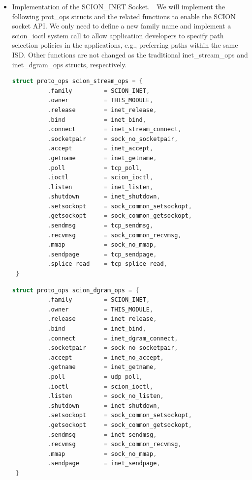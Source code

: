 \begin{itemize}
\item{Implementation of the SCION\_INET Socket.}\ \ We will implement the following prot\_ops
structs and the related functions to enable the SCION socket API. We
only need to define a new family name and implement a scion\_ioctl
system call to allow application developers to specify path
selection policies in the applications, e.g., preferring paths
within the same ISD. Other functions are not changed as the
traditional inet\_stream\_ops and inet\_dgram\_ops structs,
respectively.

\begin{footnotesize}
\begin{lstlisting}[language=C]
 struct proto_ops scion_stream_ops = {
          .family         = SCION_INET,
          .owner          = THIS_MODULE,
          .release        = inet_release,
          .bind           = inet_bind,
          .connect        = inet_stream_connect,
          .socketpair     = sock_no_socketpair,
          .accept         = inet_accept,
          .getname        = inet_getname,
          .poll           = tcp_poll,
          .ioctl          = scion_ioctl,
          .listen         = inet_listen,
          .shutdown       = inet_shutdown,
          .setsockopt     = sock_common_setsockopt,
          .getsockopt     = sock_common_getsockopt,
          .sendmsg        = tcp_sendmsg,
          .recvmsg        = sock_common_recvmsg,
          .mmap           = sock_no_mmap,
          .sendpage       = tcp_sendpage,
          .splice_read    = tcp_splice_read,
 }
\end{lstlisting}

\begin{lstlisting}[language=C]
 struct proto_ops scion_dgram_ops = {
          .family         = SCION_INET,
          .owner          = THIS_MODULE,
          .release        = inet_release,
          .bind           = inet_bind,
          .connect        = inet_dgram_connect,
          .socketpair     = sock_no_socketpair,
          .accept         = inet_no_accept,
          .getname        = inet_getname,
          .poll           = udp_poll,
          .ioctl          = scion_ioctl,
          .listen         = sock_no_listen,
          .shutdown       = inet_shutdown,
          .setsockopt     = sock_common_setsockopt,
          .getsockopt     = sock_common_getsockopt,
          .sendmsg        = inet_sendmsg,
          .recvmsg        = sock_common_recvmsg,
          .mmap           = sock_no_mmap,
          .sendpage       = inet_sendpage,
 }
\end{lstlisting}
\end{footnotesize}


\end{itemize}
